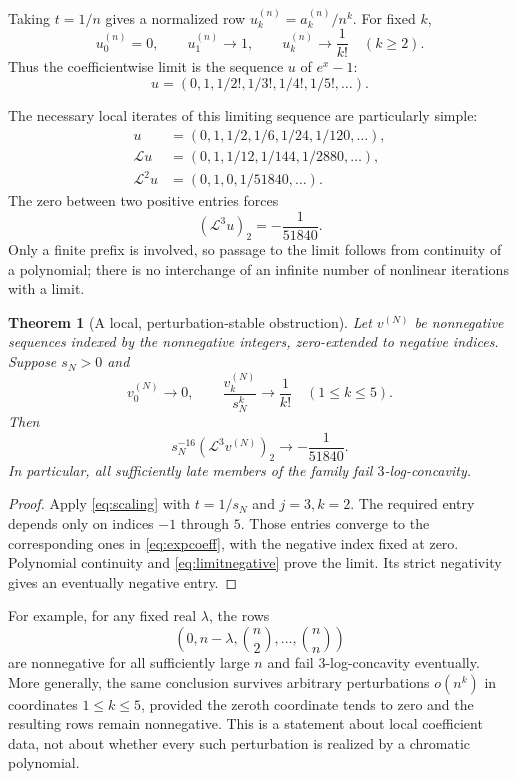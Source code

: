 \documentclass[11pt,a4paper]{article}
\newtheorem{theorem}{Theorem}[section]
\theoremstyle{definition}
\newcommand{\Lop}{\mathcal L}
\newcommand{\bin}[2]{\binom{#1}{#2}}
\begin{document}
Taking $t=1/n$ gives a normalized row $u^{(n)}_k=a^{(n)}_k/n^k$. For
fixed $k$,
\[
 u^{(n)}_0=0,\qquad u^{(n)}_1\longrightarrow1,\qquad
 u^{(n)}_k\longrightarrow\frac1{k!}\quad(k\ge2).
\]
Thus the coefficientwise limit is the sequence $u$ of $e^x-1$:
\begin{equation}\label{eq:expcoeff}
 u=(0,1,1/2!,1/3!,1/4!,1/5!,\ldots).
\end{equation}

The necessary local iterates of this limiting sequence are particularly
simple:
\begin{align*}
 u&=(0,1,1/2,1/6,1/24,1/120,\ldots),\\
 \Lop u&=(0,1,1/12,1/144,1/2880,\ldots),\\
 \Lop^2u&=(0,1,0,1/51840,\ldots).
\end{align*}
The zero between two positive entries forces
\begin{equation}\label{eq:limitnegative}
   (\Lop^3u)_2=-\frac1{51840}.
\end{equation}
Only a finite prefix is involved, so passage to the limit follows from
continuity of a polynomial; there is no interchange of an infinite number
of nonlinear iterations with a limit.

\begin{theorem}[A local, perturbation-stable obstruction]\label{thm:local}
Let $v^{(N)}$ be nonnegative sequences indexed by the nonnegative integers,
zero-extended to negative indices. Suppose $s_N>0$ and
\[
 v^{(N)}_0\longrightarrow0,\qquad
 \frac{v^{(N)}_k}{s_N^k}\longrightarrow\frac1{k!}
       \quad(1\le k\le5).
\]
Then
\begin{equation}\label{eq:local-limit}
 s_N^{-16}(\Lop^3v^{(N)})_2\longrightarrow-\frac1{51840}.
\end{equation}
In particular, all sufficiently late members of the family fail
$3$-log-concavity.
\end{theorem}
\begin{proof}
Apply \eqref{eq:scaling} with $t=1/s_N$ and $j=3,k=2$.
The required entry depends only on indices $-1$ through $5$.
Those entries converge to the corresponding ones in \eqref{eq:expcoeff},
with the negative index fixed at zero. Polynomial continuity and
\eqref{eq:limitnegative} prove the limit. Its strict negativity gives an
eventually negative entry.
\end{proof}

For example, for any fixed real $\lambda$, the rows
\[
 (0,n-\lambda,\bin n2,\ldots,\bin nn)
\]
are nonnegative for all sufficiently large $n$ and fail $3$-log-concavity
eventually. More generally, the same conclusion survives arbitrary
perturbations $o(n^k)$ in coordinates $1\le k\le5$, provided the zeroth
coordinate tends to zero and the resulting rows remain nonnegative.
This is a statement about local coefficient data, not about whether every
such perturbation is realized by a chromatic polynomial.
\end{document}

